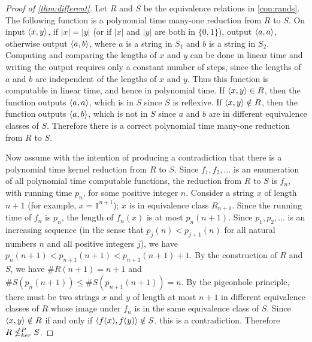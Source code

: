 \begin{proof}[Proof of \autoref{thm:different}]
  Let $R$ and $S$ be the equivalence relations in \autoref{con:rands}.
  The following function is a polynomial time many-one reduction from $R$ to $S$.
  On input $\left\langle x,y\right\rangle$, if $|x| = |y|$ (or if $|x|$ and $|y|$ are both in $\{0, 1\}$), output $\left\langle a,a\right\rangle$, otherwise output $\left\langle a,b\right\rangle$, where $a$ is a string in $S_1$ and $b$ is a string in $S_2$.
  Computing and comparing the lengths of $x$ and $y$ can be done in linear time and writing the output requires only a constant number of steps, since the lengths of $a$ and $b$ are independent of the lengths of $x$ and $y$.
  Thus this function is computable in linear time, and hence in polynomial time.
  If $\left\langle x,y\right\rangle \in R$, then the function outputs $\left\langle a,a\right\rangle$, which is in $S$ since $S$ is reflexive.
  If $\left\langle x,y\right\rangle \notin R$, then the function outputs $\left\langle a,b\right\rangle$, which is not in $S$ since $a$ and $b$ are in different equivalence classes of $S$.
  Therefore there is a correct polynomial time many-one reduction from $R$ to $S$.

  Now assume with the intention of producing a contradiction that there is a polynomial time kernel reduction from $R$ to $S$.
  Since $f_1, f_2, \dotsc$ is an enumeration of all polynomial time computable functions, the reduction from $R$ to $S$ is $f_n$, with running time $p_n$, for some positive integer $n$.
  Consider a string $x$ of length $n + 1$ (for example, $x = 1^{n + 1}$); $x$ is in equivalence class $R_{n + 1}$.
  Since the running time of $f_n$ is $p_n$, the length of $f_n(x)$ is at most $p_n(n + 1)$.
  Since $p_1, p_2, \dotsc$ is an increasing sequence (in the sense that $p_j(n) < p_{j + 1}(n)$ for all natural numbers $n$ and all positive integers $j$), we have $p_n(n + 1) < p_{n + 1}(n + 1) < p_{n + 1}(n + 1) + 1$.
  By the construction of $R$ and $S$, we have $\#R(n + 1) = n + 1$ and $\#S(p_n(n + 1)) \leq \#S(p_{n + 1}(n + 1)) = n$.
  By the pigeonhole principle, there must be two strings $x$ and $y$ of length at most $n + 1$ in different equivalence classes of $R$ whose image under $f_n$ is in the same equivalence class of $S$.
  Since $\left\langle x,y\right\rangle \notin R$ if and only if $\left\langle f(x),f(y)\right\rangle \notin S$, this is a contradiction.
  Therefore $R \nleq^{P}_{ker} S$.


\end{proof}
